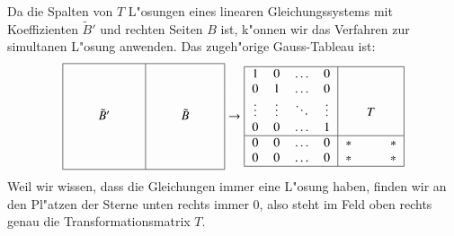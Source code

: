 Da die Spalten von $T$ L"osungen eines linearen Gleichungssystems
mit Koeffizienten $\tilde B'$ und rechten Seiten $B$ ist, k"onnen
wir das Verfahren zur simultanen L"osung anwenden.
Das zugeh"orige
Gauss-Tableau ist:
\[
\begin{tabular}{|>{$}c<{$}>{$}c<{$}>{$}c<{$}|>{$}c<{$}>{$}c<{$}>{$}c<{$}|}
\hline
\quad\mathstrut&         &\quad\mathstrut&\quad\mathstrut&        &\quad\mathstrut\\
      &         &      &      &        &      \mathstrut\\
      &         &      &      &        &      \mathstrut\\
      &\tilde B'&      &      &\tilde B&      \mathstrut\\
      &         &      &      &        &      \mathstrut\\
      &         &      &      &        &      \mathstrut\\
      &         &      &      &        &      \mathstrut\\
\hline
\end{tabular}
\rightarrow
\begin{tabular}{|>{$}c<{$}>{$}c<{$}>{$}c<{$}>{$}c<{$}|>{$}c<{$}>{$}c<{$}>{$}c<{$}|}
\hline
1     &     0&\dots   &0      & &        & \\
0     &     1&\dots   &0      & &        & \\
\vdots&\vdots&\ddots  &\vdots & &   T    & \\
0     &     0&\dots   &1      & &        & \\
\hline
0     &     0&\dots   &0      &*&        &*\\
0     &     0&\dots   &0      &*&        &*\\
\hline
\end{tabular}
\]
Weil wir wissen, dass die Gleichungen immer eine L"osung haben, finden
wir an den Pl"atzen der Sterne unten rechts immer $0$, also steht im
Feld oben rechts genau die Transformationsmatrix $T$.

